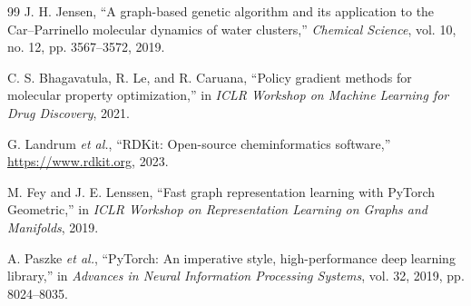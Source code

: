 \documentclass{ieeeaccess}
\begin{document}
\begin{thebibliography}{99}
J. H. Jensen,
``A graph-based genetic algorithm and its application to the Car--Parrinello molecular dynamics of water clusters,''
\emph{Chemical Science}, vol. 10, no. 12, pp. 3567--3572, 2019.

C. S. Bhagavatula, R. Le, and R. Caruana,
``Policy gradient methods for molecular property optimization,''
in \emph{ICLR Workshop on Machine Learning for Drug Discovery}, 2021.

G. Landrum \emph{et al.},
``RDKit: Open-source cheminformatics software,''
\url{https://www.rdkit.org}, 2023.

M. Fey and J. E. Lenssen,
``Fast graph representation learning with PyTorch Geometric,''
in \emph{ICLR Workshop on Representation Learning on Graphs and Manifolds}, 2019.

A. Paszke \emph{et al.},
``PyTorch: An imperative style, high-performance deep learning library,''
in \emph{Advances in Neural Information Processing Systems}, vol. 32, 2019, pp. 8024--8035.
\end{thebibliography}
\end{document}
